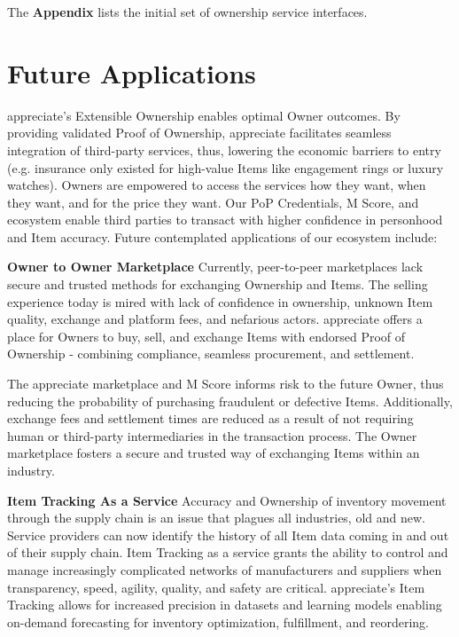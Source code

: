 \documentclass[a4paper,onecolumn, 10.5pt]{article}
\begin{document}
The \textbf{Appendix} lists the initial set of ownership service interfaces.



\section{Future Applications}

appreciate’s Extensible Ownership enables optimal Owner outcomes. By providing validated Proof of Ownership, appreciate facilitates seamless integration of third-party services, thus, lowering the economic barriers to entry (e.g. insurance only existed for high-value Items like engagement rings or luxury watches). Owners are empowered to access the services how they want, when they want, and for the price they want. Our PoP Credentials, M Score, and ecosystem enable third parties to transact with higher confidence in personhood and Item accuracy. Future contemplated applications of our ecosystem include:

\textbf{Owner to Owner Marketplace} \hfill \break
Currently, peer-to-peer marketplaces lack secure and trusted methods for exchanging Ownership and Items. The selling experience today is mired with lack of confidence in ownership, unknown Item quality, exchange and platform fees, and nefarious actors. appreciate offers a place for Owners to buy, sell, and exchange Items with endorsed Proof of Ownership - combining compliance, seamless procurement, and settlement. 

The appreciate marketplace and M Score informs risk to the future Owner, thus reducing the probability of purchasing fraudulent or defective Items. Additionally, exchange fees and settlement times are reduced as a result of not requiring human or third-party intermediaries in the transaction process. The Owner marketplace fosters a secure and trusted way of exchanging Items within an industry.

\textbf{Item Tracking As a Service} \hfill \break
Accuracy and Ownership of inventory movement through the supply chain is an issue that plagues all industries, old and new. Service providers can now identify the history of all Item data coming in and out of their supply chain. Item Tracking as a service grants the ability to control and manage increasingly complicated networks of manufacturers and suppliers when transparency, speed, agility, quality, and safety are critical. appreciate’s Item Tracking allows for increased precision in datasets and learning models enabling on-demand forecasting for inventory optimization, fulfillment, and reordering.
\end{document}
